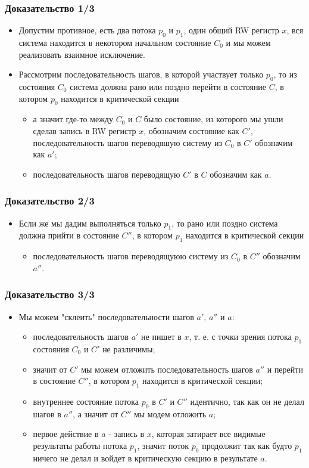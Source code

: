 \begin{frame}
\frametitle{Доказательство 1/3}
\begin{itemize}
  \item Допустим противное, есть два потока $p_0$ и $p_1$, один общий RW регистр
  $x$, вся система находится в некотором начальном состояние $C_0$ и мы можем
  реализовать взаимное исключение.
  \item Рассмотрим последовательность шагов, в которой участвует только $p_0$,
  то из состояния $C_0$ система должна рано или поздно перейти в состояние $C$,
  в котором $p_0$ находится в критической секции
  \begin{itemize}
    \item а значит где-то между $C_0$ и $C$ было состояние, из которого мы ушли
    сделав запись в RW регистр $x$, обозначим состояние как $C'$,
    последовательность шагов переводяшую систему из $C_0$ в $C'$ обозначим как
    $a'$;
    \item последовательность шагов переводящую $C'$ в $C$ обозначим как $a$.
  \end{itemize}
\end{itemize}
\end{frame}

\begin{frame}
\frametitle{Доказательство 2/3}
\begin{itemize}
  \item Если же мы дадим выполняться только $p_1$, то рано или поздно система
  должна прийти в состояние $C''$, в котором $p_1$ находится в критической
  секции
  \begin{itemize}
    \item последовательность шагов переводящуюю систему из $C_0$ в $C''$
    обозначим $a''$.
  \end{itemize}
\end{itemize}
\end{frame}

\begin{frame}
\frametitle{Доказательство 3/3}
\begin{itemize}
  \item Мы можем "склеить" последовательности шагов $a'$, $a''$ и $a$:
  \begin{itemize}
    \item последовательность шагов $a'$ не пишет в $x$, т. е. с точки зрения
    потока $p_1$ состояния $C_0$ и $C'$ не различимы;
    \item значит от $C'$ мы можем отложить последовательность шагов $a''$ и
    перейти в состояние $C''$, в котором $p_1$ находится в критической секции;
    \item внутреннее состояние потока $p_0$ в $C'$ и $C''$ идентично, так как
    он не делал шагов в $a''$, а значит от $C''$ мы модем отложить $a$;
    \item первое действие в $a$ - запись в $x$, которая затирает все видимые
    результаты работы потока $p_1$, значит поток $p_0$ продолжит так как будто
    $p_1$ ничего не делал и войдет в критическую секцию в результате $a$.
  \end{itemize}
\end{itemize}
\end{frame}
